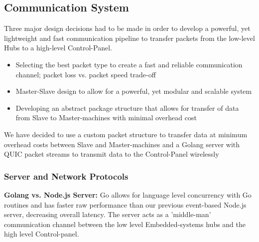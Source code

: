 \subsection{Communication System}
Three major design decisions had to be made in order to develop a powerful, yet lightweight and fast communication pipeline to transfer packets from the low-level Hubs to a high-level Control-Panel.
\begin{itemize}
    \item Selecting the best packet type to create a fast and reliable communication channel; packet loss vs. packet speed trade-off
    \item Master-Slave design to allow for a powerful, yet modular and scalable system
    \item Developing an abstract package structure that allows for transfer of data from Slave to Master-machines with minimal overhead cost
\end{itemize}
We have decided to use a custom packet structure to transfer data at minimum overhead costs between Slave and Master-machines and a Golang server with QUIC packet streams to transmit data to the Control-Panel wirelessly

\subsubsection{Server and Network Protocols}
\label{subsubsec:comm-protocols}
\textbf{Golang vs. Node.js Server:} Go allows for language level concurrency with Go routines and has faster raw performance than our previous event-based Node.js server, decreasing overall latency. The server acts as a 'middle-man' communication channel between the low level Embedded-systems hubs and the high level Control-panel.\\

